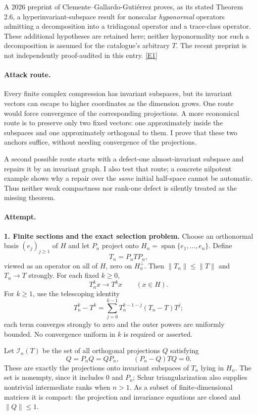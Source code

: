 \documentclass[11pt,a4paper]{article}
\newcommand{\eref}[2]{\hyperlink{extra:#1:#2}{[E#2]}}
\numberwithin{equation}{section}
\begin{document}
A 2026 preprint of Clemente--Gallardo-Guti\'errez proves, as its stated
Theorem 2.6, a hyperinvariant-subspace result for nonscalar \emph{hyponormal}
operators admitting a decomposition into a tridiagonal operator and a
trace-class operator. These additional hypotheses are retained here; neither
hyponormality nor such a decomposition is assumed for the catalogue's
arbitrary $T$. The recent preprint is not independently proof-audited in
this entry. \eref{statement}{1}

\paragraph{Attack route.}
Every finite complex compression has invariant subspaces, but its invariant
vectors can escape to higher coordinates as the dimension grows. One route
would force convergence of the corresponding projections. A more economical
route is to preserve only two fixed vectors: one approximately inside the
subspaces and one approximately orthogonal to them. I prove that these two
anchors suffice, without needing convergence of the projections.

A second possible route starts with a defect-one almost-invariant subspace
and repairs it by an invariant graph. I also test that route; a concrete
nilpotent example shows why a repair over the \emph{same} initial half-space
cannot be automatic. Thus neither weak compactness nor rank-one defect is
silently treated as the missing theorem.

\paragraph{Attempt.}
\textbf{1. Finite sections and the exact selection problem.}
Choose an orthonormal basis $(e_j)_{j\geq1}$ of $H$ and let $P_n$ project onto
$H_n=\operatorname{span}\{e_1,\ldots,e_n\}$. Define
\[
 T_n=P_nTP_n,
\]
viewed as an operator on all of $H$, zero on $H_n^\perp$. Then
$\|T_n\|\leq\|T\|$ and $T_n\to T$ strongly. For each fixed $k\geq0$,
\begin{equation}\label{statement:powers}
 T_n^k x\longrightarrow T^k x\qquad(x\in H).
\end{equation}
For $k\geq1$, use the telescoping identity
\[
 T_n^k-T^k=\sum_{j=0}^{k-1}T_n^{k-1-j}(T_n-T)T^j;
\]
each term converges strongly to zero and the outer powers are uniformly
bounded. No convergence uniform in $k$ is required or asserted.

Let $\mathcal I_n(T)$ be the set of all orthogonal projections $Q$ satisfying
\begin{equation}\label{statement:finite-invariance}
 Q=P_nQ=QP_n,\qquad (P_n-Q)TQ=0.
\end{equation}
These are exactly the projections onto invariant subspaces of $T_n$ lying
in $H_n$. The set is nonempty, since it includes $0$ and $P_n$; Schur
triangularization also supplies nontrivial intermediate ranks when $n>1$.
As a subset of finite-dimensional matrices it is compact: the projection
and invariance equations are closed and $\|Q\|\leq1$.
\end{document}

